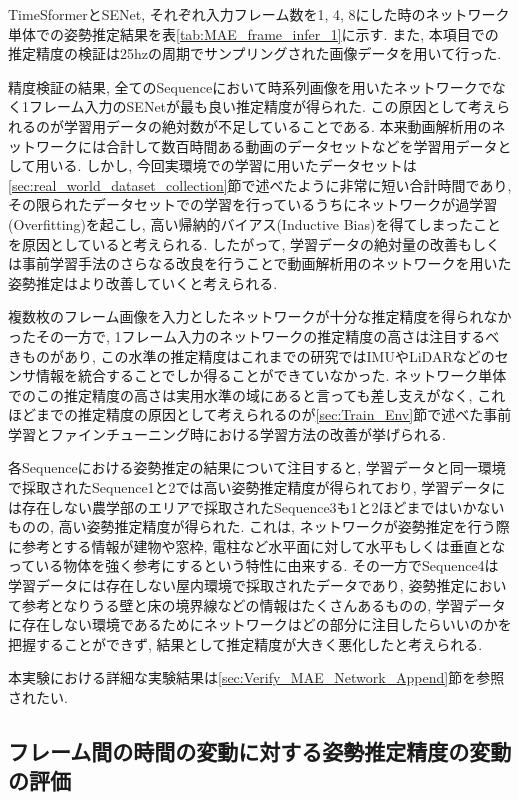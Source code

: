 TimeSformerとSENet, それぞれ入力フレーム数を1, 4, 8にした時のネットワーク単体での姿勢推定結果を表\ref{tab:MAE_frame_infer_1}に示す. また, 本項目での推定精度の検証は25hzの周期でサンプリングされた画像データを用いて行った. \par
精度検証の結果, 全てのSequenceにおいて時系列画像を用いたネットワークでなく1フレーム入力のSENetが最も良い推定精度が得られた. この原因として考えられるのが学習用データの絶対数が不足していることである. 本来動画解析用のネットワークには合計して数百時間ある動画のデータセットなどを学習用データとして用いる\cite{Video_Recognition_Paper}. しかし, 今回実環境での学習に用いたデータセットは\ref{sec:real_world_dataset_collection}節で述べたように非常に短い合計時間であり, その限られたデータセットでの学習を行っているうちにネットワークが過学習(Overfitting)\cite{Overfitting_paper}を起こし, 高い帰納的バイアス(Inductive Bias)\cite{Inductive_Bias_paper}を得てしまったことを原因としていると考えられる. したがって, 学習データの絶対量の改善もしくは事前学習手法のさらなる改良を行うことで動画解析用のネットワークを用いた姿勢推定はより改善していくと考えられる.\par
複数枚のフレーム画像を入力としたネットワークが十分な推定精度を得られなかったその一方で, 1フレーム入力のネットワークの推定精度の高さは注目するべきものがあり, この水準の推定精度はこれまでの研究ではIMUやLiDARなどのセンサ情報を統合することでしか得ることができていなかった. ネットワーク単体でのこの推定精度の高さは実用水準の域にあると言っても差し支えがなく, これほどまでの推定精度の原因として考えられるのが\ref{sec:Train_Env}節で述べた事前学習とファインチューニング時における学習方法の改善が挙げられる.\par
各Sequenceにおける姿勢推定の結果について注目すると, 学習データと同一環境で採取されたSequence1と2では高い姿勢推定精度が得られており, 学習データには存在しない農学部のエリアで採取されたSequence3も1と2ほどまではいかないものの, 高い姿勢推定精度が得られた. これは, ネットワークが姿勢推定を行う際に参考とする情報が建物や窓枠, 電柱など水平面に対して水平もしくは垂直となっている物体を強く参考にするという特性\cite{Kawai_SII2023}に由来する. その一方でSequence4は学習データには存在しない屋内環境で採取されたデータであり, 姿勢推定において参考となりうる壁と床の境界線などの情報はたくさんあるものの, 学習データに存在しない環境であるためにネットワークはどの部分に注目したらいいのかを把握することができず, 結果として推定精度が大きく悪化したと考えられる. \par
本実験における詳細な実験結果は\ref{sec:Verify_MAE_Network_Append}節を参照されたい.


\subsection{フレーム間の時間の変動に対する姿勢推定精度の変動の評価}\label{sec:Verify_hz_Network}

